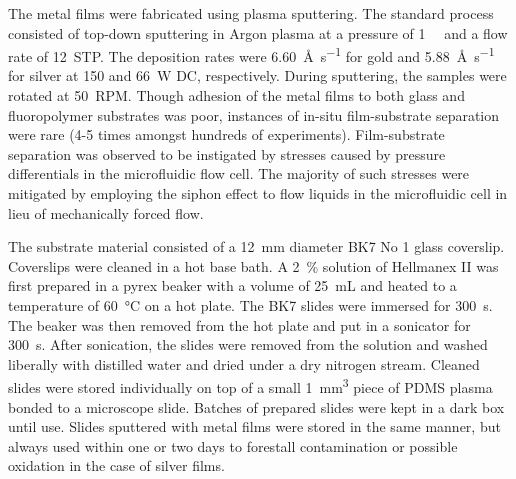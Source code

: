 The metal films were fabricated using plasma sputtering.  The standard
process consisted of top-down sputtering in Argon plasma at a pressure of
\SI{1}{\milli\torr} and a flow rate of \SI{12}{STP}.  The deposition rates
were \SI{6.60}{\angstrom\per\second} for gold and
\SI{5.88}{\angstrom\per\second} for silver at 150 and \SI{66}{\watt} DC,
respectively.  During sputtering, the samples were rotated at \SI{50}{RPM}.
Though adhesion of the metal films to both glass and fluoropolymer
substrates was poor, instances of in-situ film-substrate separation were
rare (4-5 times amongst hundreds of experiments).  Film-substrate
separation was observed to be instigated by stresses caused by pressure
differentials in the microfluidic flow cell.  The majority of such stresses
were mitigated by employing the siphon effect to flow liquids in the
microfluidic cell in lieu of mechanically forced flow.


The substrate material consisted of a \SI{12}{\milli\meter} diameter BK7 No
1 glass coverslip.  Coverslips were cleaned in a hot base bath.  A
\SI{2}{\percent} solution of Hellmanex II was first prepared in a pyrex
beaker with a volume of \SI{25}{\milli\liter} and heated to a temperature
of \SI{60}{\celsius} on a hot plate.  The BK7 slides were immersed for
\SI{300}{\second}.  The beaker was then removed from the hot plate and put
in a sonicator for \SI{300}{\second}.  After sonication, the slides were
removed from the solution and washed liberally with distilled water and
dried under a dry nitrogen stream.  Cleaned slides were stored individually
on top of a small \SI{1}{\milli\meter\cubed} piece of PDMS plasma bonded to
a microscope slide. Batches of prepared slides were kept in a dark box
until use.  Slides sputtered with metal films were stored in the same
manner, but always used within one or two days to forestall contamination
or possible oxidation in the case of silver films.

